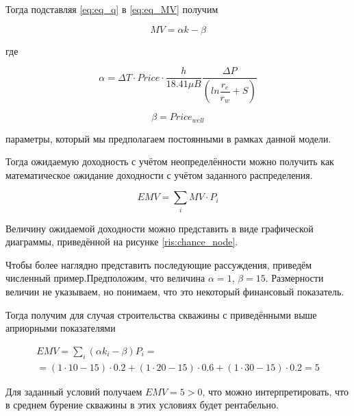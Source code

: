 Тогда подставляя \eqref{eq:eq_q} в \eqref{eq:eq_MV} получим 

\begin{equation}
	MV = \alpha k - \beta
	\label{eq:eq_MV_2}
\end{equation}

где 

$$\alpha =  \Delta T \cdot  Price \cdot \frac{h}{18.41 \mu B} \frac{\Delta P}{  \left( ln\dfrac{r_e}{r_w} + S\right)}
$$ 

$$
\beta = Price_{well}
$$

параметры, который мы предполагаем постоянными в рамках данной модели. 

Тогда ожидаемую доходность с учётом неопределённости можно получить как математическое ожидание доходности с учётом заданного распределения. 

\begin{equation}
	EMV = \sum_{i} MV \cdot P_i 
\end{equation}

Величину ожидаемой доходности можно представить в виде графической диаграммы, приведённой на рисунке \ref{ris:chance_node}.

Чтобы более наглядно представить последующие рассуждения, приведём численный пример.Предположим, что величина $\alpha = 1$, $\beta = 15$. Размерности величин не указываем, но понимаем, что это некоторый финансовый показатель.  

Тогда получим для случая строительства скважины с приведёнными выше априорными показателями 

\begin{multline}
	EMV = \sum_{i} (\alpha k_i - \beta ) P_i = \\
	= (1 \cdot 10 - 15) \cdot 0.2 + (1 \cdot 20 - 15)\cdot 0.6 + (1 \cdot 30 - 15)\cdot 0.2 = 5
\end{multline}

Для заданный условий получаем $EMV =5 > 0$, что можно интерпретировать, что в среднем бурение скважины в этих условиях будет рентабельно.


